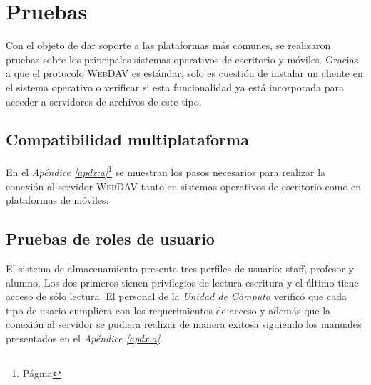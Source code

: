 {
  \linespread{1}
  \cleardoublepage  
  \chapter{Pruebas}
  \label{chap:cap4}
}

Con el objeto de dar soporte a las plataformas m\'{a}s comunes, se realizaron pruebas sobre los principales sistemas operativos de escritorio y m\'{o}viles. Gracias a que el protocolo \textsc{WebDAV} es est\'{a}ndar, solo es cuesti\'{o}n de instalar un cliente en el sistema operativo o verificar si esta funcionalidad ya est\'{a} incorporada para acceder a servidores de archivos de este tipo.

    \section {Compatibilidad multiplataforma}

En el \textsl{Ap\'{e}ndice \ref{apdx:a}}\footnote{P\'{a}gina \pageref{apdx:a}} se muestran los pasos necesarios para realizar la conexi\'{o}n al servidor \textsc{WebDAV} tanto en sistemas operativos de escritorio como en plataformas de m\'{o}viles.

    \section {Pruebas de roles de usuario}

El sistema de almacenamiento presenta tres perfiles de usuario: staff, profesor y alumno. Los dos primeros tienen privilegios de lectura-escritura y el \'{u}ltimo tiene acceso de s\'{o}lo lectura. El personal de la \textit{Unidad de C\'{o}mputo} verific\'{o} que cada tipo de usario cumpliera con los requerimientos de acceso y adem\'{a}s que la conexi\'{o}n al servidor se pudiera realizar de manera exitosa siguiendo los manuales presentados en el \textsl{Ap\'{e}ndice \ref{apdx:a}}.

{
 \linespread{1}
 \begin{table}[H]
 \caption{Perfiles de usuario y tipo de acceso}{}
 \label{tab:user-profiles}
 \noindent{} %
 \end{table}
}

